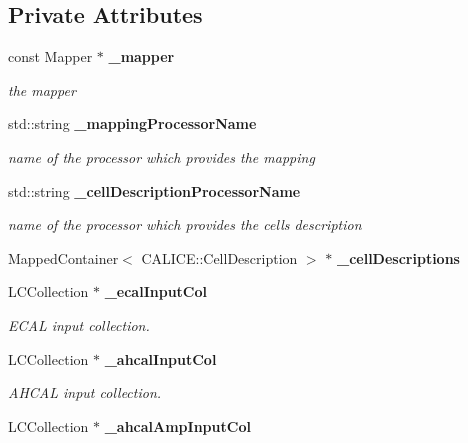 \subsection*{Private Attributes}
\begin{DoxyCompactItemize}
\item 
const Mapper $\ast$ {\bf \_\-mapper}\label{classCALICE_1_1AngleTrackFinder_a1e8ade0f953c3f0e73665cf8bb6fc58f}

\begin{DoxyCompactList}\small\item\em the mapper \item\end{DoxyCompactList}\item 
std::string {\bf \_\-mappingProcessorName}\label{classCALICE_1_1AngleTrackFinder_a8ed332f4a4fac3a16df92f32cec1ca23}

\begin{DoxyCompactList}\small\item\em name of the processor which provides the mapping \item\end{DoxyCompactList}\item 
std::string {\bf \_\-cellDescriptionProcessorName}\label{classCALICE_1_1AngleTrackFinder_a9094f5b2aa449c3bd3180fe4fc7094d2}

\begin{DoxyCompactList}\small\item\em name of the processor which provides the cells description \item\end{DoxyCompactList}\item 
MappedContainer$<$ CALICE::CellDescription $>$ $\ast$ {\bfseries \_\-cellDescriptions}\label{classCALICE_1_1AngleTrackFinder_a570dfea9f64f3eaf487ea8db682d03ec}

\item 
LCCollection $\ast$ {\bf \_\-ecalInputCol}\label{classCALICE_1_1AngleTrackFinder_a6c55f00b24dedf933046c374d57567a2}

\begin{DoxyCompactList}\small\item\em ECAL input collection. \item\end{DoxyCompactList}\item 
LCCollection $\ast$ {\bf \_\-ahcalInputCol}\label{classCALICE_1_1AngleTrackFinder_a6294fed90962d5ecaf2d63f4f119c808}

\begin{DoxyCompactList}\small\item\em AHCAL input collection. \item\end{DoxyCompactList}\item 
LCCollection $\ast$ {\bf \_\-ahcalAmpInputCol}\label{classCALICE_1_1AngleTrackFinder_a63d915b7e5159274be1cec89db2c0390}


\end{DoxyCompactItemize}
